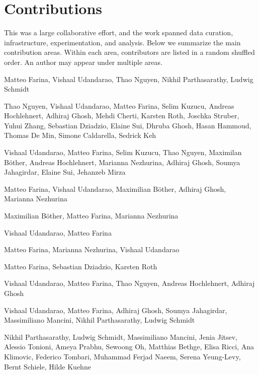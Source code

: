 
\section{Contributions}\label{app:contributions}

This was a large collaborative effort, and the work spanned data curation, infrastructure, experimentation, and analysis. Below we summarize the main contribution areas. Within each area, contributors are listed in a random shuffled order. An author may appear under multiple areas.

 Matteo Farina, Vishaal Udandarao, Thao Nguyen, Nikhil Parthasarathy, Ludwig Schmidt

 Thao Nguyen, Vishaal Udandarao, Matteo Farina, Selim Kuzucu, Andreas Hochlehnert, Adhiraj Ghosh, Mehdi Cherti, Karsten Roth, Joschka Struber, Yuhui Zhang, Sebastian Dziadzio, Elaine Sui, Dhruba Ghosh, Hasan Hammoud, Thomas De Min, Simone Caldarella, Sedrick Keh 

 Vishaal Udandarao, Matteo Farina, Selim Kuzucu, Thao Nguyen, Maximilan Böther, Andreas Hochlehnert, Marianna Nezhurina, Adhiraj Ghosh, Soumya Jahagirdar, Elaine Sui, Jehanzeb Mirza

 Matteo Farina, Vishaal Udandarao, Maximilian Böther, Adhiraj Ghosh, Marianna Nezhurina

 Maximilian Böther, Matteo Farina, Marianna Nezhurina

 Vishaal Udandarao, Matteo Farina

 Matteo Farina, Marianna Nezhurina, Vishaal Udandarao

 Matteo Farina, Sebastian Dziadzio, Karsten Roth

 Vishaal Udandarao, Matteo Farina, Thao Nguyen, Andreas Hochlehnert, Adhiraj Ghosh

 Vishaal Udandarao, Matteo Farina, Adhiraj Ghosh, Soumya Jahagirdar, Massimiliano Mancini, Nikhil Parthasarathy, Ludwig Schmidt

 Nikhil Parthasarathy, Ludwig Schmidt, Massimiliano Mancini, Jenia Jitsev, Alessio Tonioni, Ameya Prabhu, Sewoong Oh, Matthias Bethge, Elisa Ricci, Ana Klimovic, Federico Tombari, Muhammad Ferjad Naeem, Serena Yeung-Levy, Bernt Schiele, Hilde Kuehne

